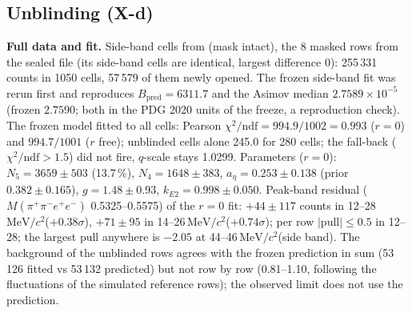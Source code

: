 \documentclass[11pt,a4paper]{article}
\newcommand{\piz}{\ensuremath{\pi^{0}}\xspace}
\newcommand{\ee}{\ensuremath{e^{+}e^{-}}\xspace}
\newcommand{\pipi}{\ensuremath{\pi^{+}\pi^{-}}\xspace}
\newcommand{\Mfour}{\ensuremath{M(\pi^{+}\pi^{-}e^{+}e^{-})}\xspace}
\newcommand{\Mee}{\ensuremath{M(e^{+}e^{-})}\xspace}
\newcommand{\nbinv}{\ensuremath{\mathrm{nb}^{-1}}\xspace}
\newcommand{\MeVcc}{\ensuremath{\mathrm{MeV}/c^{2}}\xspace}
\newcommand{\code}[1]{\texttt{\detokenize{#1}}}
\newcommand{\aEta}{\ensuremath{a_\eta}\xspace}
\newcommand{\kEtwo}{\ensuremath{k_{E2}}\xspace}
\newcommand{\BRX}{\ensuremath{\mathrm{BR}(\eta\to\pipi X17)\,\mathrm{BR}(X17\to\ee)}\xspace}
\newcommand{\tabin}[1]{}
\begin{document}
\subsection{Unblinding (X-d)}
\label{sec:x17d}
\textbf{Full data and fit.} Side-band cells from \code{hists_v1.root} (mask intact), the 8 masked rows from the sealed file (its side-band cells are
identical, largest difference 0): 255\,331 counts in 1050 cells, 57\,579 of them newly opened. The frozen side-band fit was rerun first and reproduces
$B_{\mathrm{pred}}=6311.7$ and the Asimov median $2.7589\times10^{-5}$ (frozen $2.7590$; both in the PDG 2020 units of the freeze, a reproduction check). The frozen model fitted to all cells: Pearson $\chi^2/\mathrm{ndf}=
994.9/1002=0.993$ ($r=0$) and $994.7/1001$ ($r$ free); unblinded cells alone 245.0 for 280 cells; the fall-back ($\chi^2/\mathrm{ndf}>1.5$) did not fire,
$q$-scale stays 1.0299. Parameters ($r=0$): $N_5=3659\pm503$ (13.7\,\%), $N_4=1648\pm383$, $\aEta=0.253\pm0.138$ (prior $0.382\pm0.165$), $g=1.48\pm0.93$,
$\kEtwo=0.998\pm0.050$. Peak-band residual (\Mfour 0.5325--0.5575) of the $r=0$ fit: $+44\pm117$ counts in 12--28\,\MeVcc ($+0.38\sigma$), $+71\pm95$ in
14--26\,\MeVcc ($+0.74\sigma$); per row $|$pull$|\le0.5$ in 12--28; the largest pull anywhere is $-2.05$ at 44--46\,\MeVcc (side band). The background of the
unblinded rows agrees with the frozen prediction in sum (53\,126 fitted vs 53\,132 predicted) but not row by row (0.81--1.10, following the fluctuations of
the simulated reference rows); the observed limit does not use the prediction.

\begin{table}[H]
\centering
\caption{Spec.\ Table~D1: observed 90\,\% CL$_s$ upper limits on \BRX at three masses and in the three normalisations of the frozen procedure: (1) $r\times
2.76\times10^{-4}$ (PDG 2026, D25: the frozen code rerun with only BR$_{\mathrm{dir}}$ changed; the frozen PDG 2020 value gives $3.06\times10^{-5}$ at
17\,\MeVcc) with $N_5$ fitted (primary; the specification's fall-back would make (2) primary; D30, approved: (1) primary, (2) quoted next to it); (2) $N_X/(\aEta s_{\mathrm{X2D}})$; (3) relative to the measured $\eta$ peak. Expected $=$ frozen
background-only toys (median and 68\,\% band), computed before the \Mee 12--28\,\MeVcc rows were opened. $N_X^{\mathrm{UL}}$: direct 90\,\% CL$_s$ limit on the
number of X17 counts (raw counts; 398 after $\times64/63$ at 17\,\MeVcc), the same in all normalisations. Data S0, isBest $\ge0$, X2D, $L=6079.2\,\nbinv$,
isotropic $e^+$ angle. Template statistics (MC: CB $\oplus$ C4 replicas, 11\,\% in (1)) and the $1+\cos^2$ hypothesis are quoted separately. Source:
x17d with the corrections of the verifier vx (\code{x17d_D1.txt}), converted to PDG 2026 in \code{x17d_D1_pdg26.txt} ((2) $\times1.00436$ and
(3) $\times1.0224$ through the PDG 2026 BR$(\eta\to\pipi\piz)$ in their $\eta$ scales; toy columns $\times1.0299\,k$). No fall-back fired on the
data (D30, approved: normalisation (1) primary, (2) quoted next to it).}
\label{tab:D1}
\footnotesize
\resizebox{\textwidth}{!}{\tabin{x17d_D1_pdg26.tex}}
\end{table}
\end{document}
